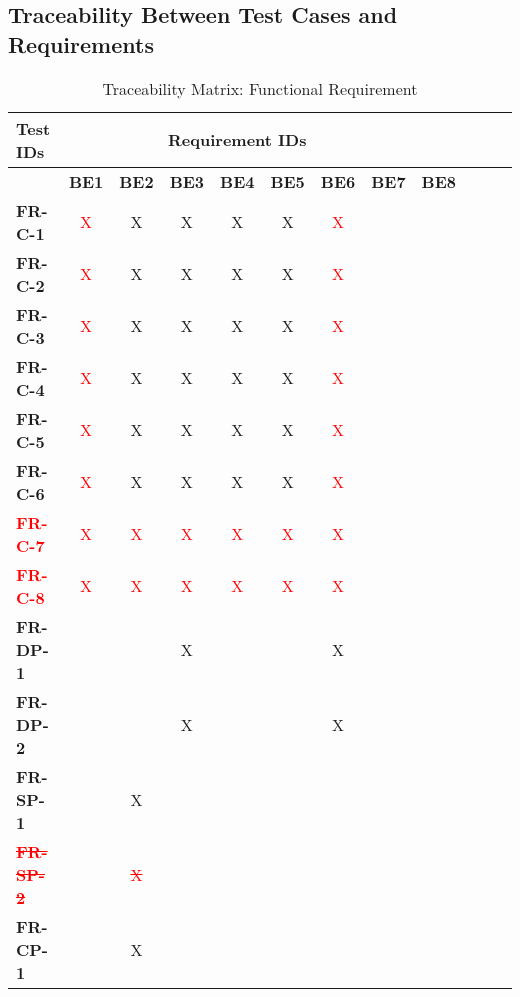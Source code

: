 \documentclass[12pt, titlepage]{article}
\begin{document}
\subsection{Traceability Between Test Cases and Requirements}
\begin{table}[H]
    \centering
    \caption{Traceability Matrix: Functional Requirement}
    \begin{adjustbox}{max width=0.7\paperwidth}
    \begin{tabular}{l|ccccccccccc}
        \textbf{Test IDs} & \multicolumn{7}{c}{\textbf{Requirement IDs}}\\
        \hline
        ~ & \textbf{BE1} & \textbf{BE2} & \textbf{BE3} & \textbf{BE4} & \textbf{BE5} & \textbf{BE6} & \textbf{BE7} & \textbf{BE8}\\
        \textbf{FR-C-1}    &\textcolor{red}{X}  & X & X & X & X & \textcolor{red}{X} & ~ & ~\\
        \textbf{FR-C-2}    &\textcolor{red}{X} & X & X & X & X & \textcolor{red}{X} & ~ & ~\\
        \textbf{FR-C-3}    &\textcolor{red}{X} & X & X & X & X & \textcolor{red}{X} & ~ & ~\\
        \textbf{FR-C-4}    &\textcolor{red}{X} & X & X & X & X &\textcolor{red}{X} & ~ & ~\\
        \textbf{FR-C-5}    &\textcolor{red}{X} & X & X & X & X &\textcolor{red}{X} & ~ & ~\\
        \textbf{FR-C-6}    &\textcolor{red}{X} & X & X & X & X & \textcolor{red}{X} & ~ & ~\\
        \textbf{\textcolor{red}{{FR-C-7} }} & \textcolor{red}{X} & \textcolor{red}{X} & \textcolor{red}{X} & \textcolor{red}{X} & \textcolor{red}{X} & \textcolor{red}{X} & ~ & ~\\
        \textbf{\textcolor{red}{{FR-C-8} }} & \textcolor{red}{X} & \textcolor{red}{X} & \textcolor{red}{X} & \textcolor{red}{X} & \textcolor{red}{X} & \textcolor{red}{X} & ~ & ~\\
        \textbf{FR-DP-1}   & ~ & ~ & X & ~ & ~ & X & ~ & ~\\
        \textbf{FR-DP-2}   & ~ & ~ & X & ~ & ~ & X & ~ & ~\\
        \textbf{FR-SP-1}   & ~ & X & ~ & ~ & ~ & ~ & ~ & ~\\
        \textcolor{red}{\sout{\textbf{FR-SP-2}}}   & ~ & \textcolor{red}{\sout{X}} & ~ & ~ & ~ & ~ & ~ & ~\\
        \textbf{FR-CP-1}   & ~ & X & ~ & ~ & ~ & ~ & ~ & ~\\

\end{tabular}
\end{adjustbox}
\end{table}
\end{document}
